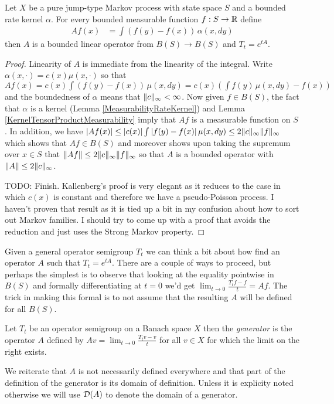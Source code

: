 \begin{prop}Let $X$ be a pure jump-type Markov process with state space $S$ and a bounded rate kernel $\alpha$.  For every bounded measurable function $f : S \to \mathbb{R}$ define
\begin{align*}
Af (x) &= \int (f(y) - f(x)) \, \alpha(x, dy)
\end{align*}
then $A$ is a bounded linear operator from $B(S) \to B(S)$ and $T_t = e^{tA}$.
\end{prop}
\begin{proof}
Linearity of $A$ is immediate from the linearity of the integral.  Write $\alpha(x,\cdot) = c(x) \mu(x, \cdot)$ so that $Af(x) = c(x) \int (f(y) - f(x)) \, \mu(x, dy) = c(x) (\int f(y) \, \mu(x, dy) - f(x))$ and the boundedness of $\alpha$ means that $\lVert c \rVert_\infty < \infty$.  Now given $f \in B(S)$, the fact that $\alpha$ is a kernel (Lemma \ref{MeasurabilityRateKernel}) and Lemma \ref{KernelTensorProductMeasurability} imply that $Af$ is a measurable function on $S$.  In addition, we have $\left \vert Af(x) \right \vert \leq \left \vert c(x) \right \vert \int \left \vert f(y) - f(x) \right \vert \mu(x, dy) \leq 2 \lVert c \rVert_\infty \lVert f \rVert_\infty$ which shows that $Af \in B(S)$ and moreover shows upon taking the supremum over $x \in S$ that $\lVert Af \rVert \leq 2 \lVert c \rVert_\infty \lVert f \rVert_\infty$ so that $A$ is a bounded operator with $\lVert A \rVert \leq 2 \lVert c \rVert_\infty$.  

TODO:  Finish.  Kallenberg's proof is very elegant as it reduces to the case in which $c(x)$ is constant and therefore we have a pseudo-Poisson process.  I haven't proven that result as it is tied up a bit in my confusion about how to sort out Markov families.  I should try to come up with a proof that avoids the reduction and just uses the Strong Markov property.
\end{proof}

Given a general operator semigroup $T_t$ we can think a bit about how find an operator $A$ such that $T_t = e^{tA}$.  There are a couple of ways to proceed, but perhaps the simplest is to observe that looking at the equality pointwise in $B(S)$  and formally differentiating at $t=0$ we'd get $\lim_{t \to 0} \frac{T_tf - f}{t} = Af$.  The trick in making this formal is to not assume that the resulting $A$ will be defined for all $B(S)$.
\begin{defn}Let $T_t$ be an operator semigroup on a Banach space $X$ then the \emph{generator} is the operator $A$ defined by $A v = \lim_{t \to 0} \frac{T_tv -v}{t}$ for all $v \in X$ 
for which the limit on the right exists.  
\end{defn}
We reiterate that $A$ is not necessarily defined everywhere and that part of the definition of the generator is its domain of definition.  Unless it is explicity noted otherwise we will use $\mathcal{D}(A)$ to denote the domain of a generator.

